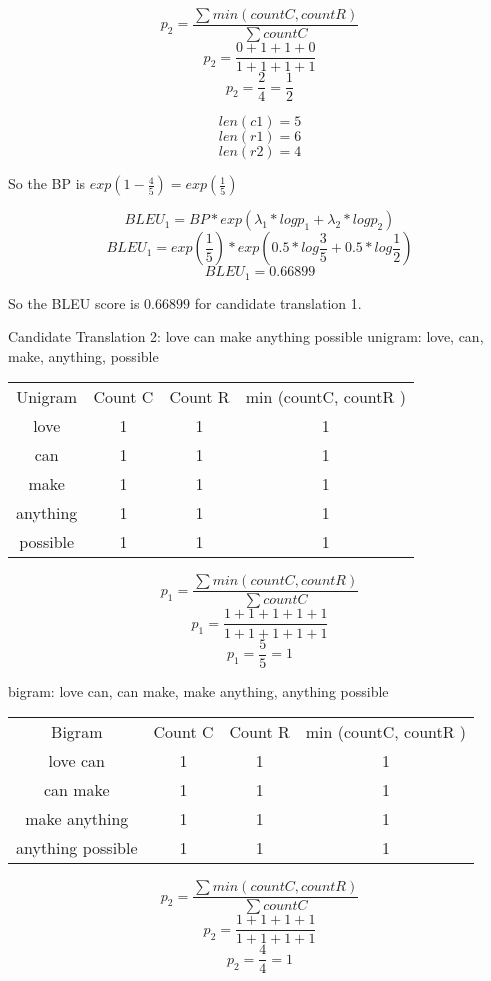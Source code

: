 \documentclass[11pt,largemargins]{homework}
\begin{document}
$$ p_2 = \frac{\sum min (countC, countR)}{ \sum countC } $$
$$ p_2 = \frac{0 + 1 + 1 + 0}{ 1 + 1 + 1 + 1 } $$
$$ p_2 = \frac{2}{4} = \frac{1}{2} $$


$$len(c1) = 5$$
$$len(r1) = 6$$
$$len(r2) = 4$$


So the BP is $exp(1 - \frac{4}{5}) = exp(\frac{1}{5})$

$$BLEU_1 = BP * exp(\lambda_1 * log p_1 + \lambda_2 * log p_2) $$  
$$BLEU_1 = exp(\frac{1}{5}) * exp(0.5 * log \frac{3}{5} + 0.5 * log \frac{1}{2}) $$  
$$BLEU_1 = 0.66899 $$

So the BLEU score is $0.66899$ for candidate translation 1.

\hfill \break
\hfill \break
\hfill \break
Candidate Translation 2: love can make anything possible
unigram: love, can, make, anything, possible

\begin{center}
\begin{tabular}{ |c|c|c|c| }
 \hline
   Unigram & Count C & Count R & min (countC, countR ) \\
   love & 1 & 1 & 1 \\ 
   can & 1 & 1 & 1 \\
   make & 1 & 1 & 1 \\
   anything & 1 & 1 & 1 \\
   possible & 1 & 1 & 1 \\
 \hline
\end{tabular}
\end{center}

$$ p_1 = \frac{\sum min (countC, countR)}{ \sum countC } $$
$$ p_1 = \frac{1 + 1 + 1 + 1 + 1}{ 1 + 1 + 1 + 1 + 1 } $$
$$ p_1 = \frac{5}{5} = 1 $$



bigram: love can, can make, make anything, anything possible

\begin{center}
\begin{tabular}{ |c|c|c|c| }
 \hline
   Bigram & Count C & Count R & min (countC, countR ) \\
   love can & 1 & 1 & 1 \\ 
   can make& 1 & 1 & 1 \\
   make anything& 1 & 1 & 1 \\
   anything possible & 1 & 1 & 1 \\
 \hline
\end{tabular}
\end{center}

$$ p_2 = \frac{\sum min (countC, countR)}{ \sum countC } $$
$$ p_2 = \frac{1 + 1 + 1 + 1}{ 1 + 1 + 1 + 1 } $$
$$ p_2 = \frac{4}{4} = 1 $$
\end{document}
